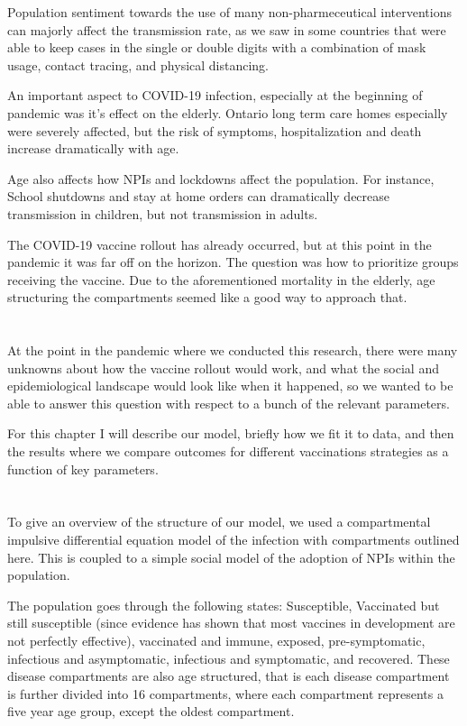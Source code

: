 \documentclass{article}
\begin{document}
Population sentiment towards the use of many non-pharmeceutical interventions can majorly affect the transmission rate, as we saw in some countries that were able to keep cases in the single or double digits with a combination of mask usage, contact tracing, and physical distancing.

An important aspect to COVID-19 infection, especially at the beginning of pandemic was it's effect on the elderly. Ontario long term care homes especially were severely affected, but the risk of symptoms, hospitalization and death increase dramatically with age. 

Age also affects how NPIs and lockdowns affect the population. For instance, School shutdowns and stay at home orders can dramatically decrease transmission in children, but not transmission in adults.  

The COVID-19 vaccine rollout has already occurred, but at this point in the pandemic it was far off on the horizon. The question was how to prioritize groups receiving the vaccine. Due to the aforementioned mortality in the elderly, age structuring the compartments seemed like a good way to approach that. 


\section{}

At the point in the pandemic where we conducted this research, there were many unknowns about how the vaccine rollout would work, and what the social and epidemiological landscape would look like when it happened, so we wanted to be able to answer this question with respect to a bunch of the relevant parameters.


For this chapter I will describe our model, briefly how we fit it to data, and then the results where we compare outcomes for different vaccinations strategies as a function of key parameters.



\section{}

To give an overview of the structure of our model, we used a compartmental impulsive differential equation model of the infection with compartments outlined here. This is coupled to a simple social model of the adoption of NPIs within the population.

The population goes through the following states: Susceptible, Vaccinated but still susceptible (since evidence has shown that most vaccines in development are not perfectly effective), vaccinated and immune, exposed, pre-symptomatic, infectious and asymptomatic, infectious and symptomatic, and recovered. These disease compartments are also age structured, that is each disease compartment is further divided into 16 compartments, where each compartment represents a five year age group, except the oldest compartment.
\end{document}
